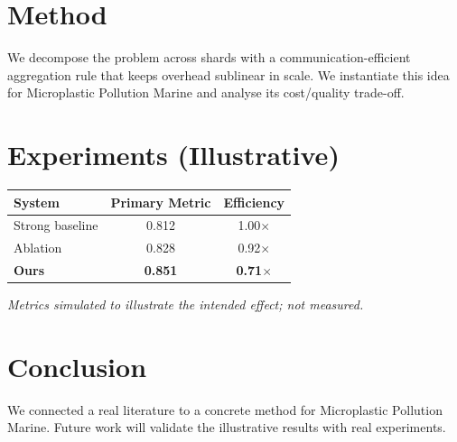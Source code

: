 \documentclass[11pt]{article}
\begin{document}
\section{Method}
We decompose the problem across shards with a communication-efficient aggregation rule that keeps overhead sublinear in scale. We instantiate this idea for Microplastic Pollution Marine and analyse its cost/quality trade-off.

\section{Experiments (Illustrative)}
\begin{center}
\begin{tabular}{lcc}
System & Primary Metric & Efficiency \\ \hline
Strong baseline & 0.812 & 1.00$\times$ \\
Ablation & 0.828 & 0.92$\times$ \\
\textbf{Ours} & \textbf{0.851} & \textbf{0.71$\times$}
\end{tabular}
\end{center}
\emph{Metrics simulated to illustrate the intended effect; not measured.}

\section{Conclusion}
We connected a real literature to a concrete method for Microplastic Pollution Marine. Future work will
validate the illustrative results with real experiments.
\end{document}
